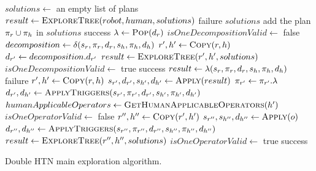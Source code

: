 \documentclass[a4paper,11pt,twoside]{StyleThese}
\begin{document}
\begin{algorithm}[H]
\begin{algorithmic}[1]
\State $solutions \leftarrow$ an empty list of plans
\State $result \leftarrow \textsc{ExploreTree}(robot, human, solutions)$
 \Return failure \EndIf
\State \Return $solutions$
\EndFunction
\Statex
{}
	\State add the plan $\pi_r \cup \pi_h$ in $solutions$
	\State \Return success
\EndIf
\State $\lambda \leftarrow \textsc{Pop}(d_r)$
	\State $isOneDecompositionValid \leftarrow$ false
		\State $decomposition \leftarrow \delta(s_r, \pi_r, d_r, s_h, \pi_h, d_h)$
			\State $r', h' \leftarrow \textsc{Copy}(r, h)$ 
			\State $d_{r'} \leftarrow decomposition.d_{r'}$
			\State $result \leftarrow \textsc{ExploreTree}(r', h', solutions)$
				$isOneDecompositionValid \leftarrow$ true
			\EndIf
		\EndIf
	\EndFor
	 \Return success \EndIf
\EndIf
{}
	\State $result \leftarrow \lambda(s_r, \pi_r, d_r, s_h, \pi_h, d_h)$
		\Return failure
	\EndIf
	\State $r', h' \leftarrow \textsc{Copy}(r, h)$ 
	\State $s_{r'}, d_{r'}, s_{h'}, d_{h'} \leftarrow \textsc{Apply}(result)$
	\State $\pi_{r'} \leftarrow \pi_{r'}.\lambda$
	\State $d_{r'}, d_{h'} \leftarrow \textsc{ApplyTriggers}(s_{r'}, \pi_{r'}, d_{r'}, s_{h'}, \pi_{h'}, d_{h'})$
	\State $humanApplicableOperators \leftarrow \textsc{GetHumanApplicableOperators}(h')$
	\State $isOneOperatorValid \leftarrow$ false
		\State $r'', h'' \leftarrow \textsc{Copy}(r', h')$
		\State $s_{r''}, s_{h''}, d_{h''} \leftarrow \textsc{Apply}(o)$
		\State $d_{r''}, d_{h''} \leftarrow \textsc{ApplyTriggers}(s_{r''}, \pi_{r''}, d_{r''}, s_{h''}, \pi_{h''}, d_{h''})$
		\State $result \leftarrow \textsc{ExploreTree}(r'', h'', solutions)$
		 $isOneOperatorValid \leftarrow$ true \EndIf
	\EndFor
	 \Return success \EndIf
\EndIf
\EndFunction
\end{algorithmic}
 \caption{Double HTN main exploration algorithm.}
  \label{alg:seek_plans}
\end{algorithm}
\end{document}
